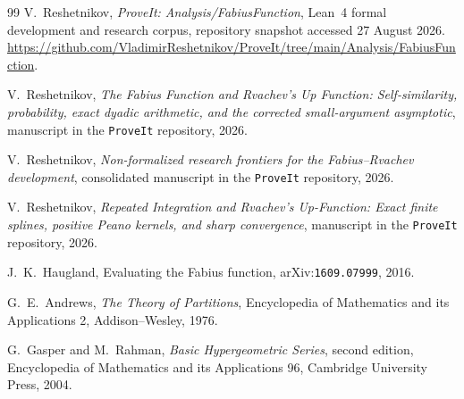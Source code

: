 \documentclass[11pt]{article}
\numberwithin{equation}{section}
\theoremstyle{definition}
\theoremstyle{remark}
\begin{document}
\begin{thebibliography}{99}
V.~Reshetnikov,
\newblock \emph{ProveIt: Analysis/FabiusFunction},
\newblock Lean~4 formal development and research corpus, repository snapshot accessed 27 August 2026.
\newblock \url{https://github.com/VladimirReshetnikov/ProveIt/tree/main/Analysis/FabiusFunction}.

V.~Reshetnikov,
\newblock \emph{The Fabius Function and Rvachev's Up Function: Self-similarity, probability, exact dyadic arithmetic, and the corrected small-argument asymptotic},
\newblock manuscript in the \texttt{ProveIt} repository, 2026.

V.~Reshetnikov,
\newblock \emph{Non-formalized research frontiers for the Fabius--Rvachev development},
\newblock consolidated manuscript in the \texttt{ProveIt} repository, 2026.

V.~Reshetnikov,
\newblock \emph{Repeated Integration and Rvachev's Up-Function: Exact finite splines, positive Peano kernels, and sharp convergence},
\newblock manuscript in the \texttt{ProveIt} repository, 2026.

J.~K.~Haugland,
\newblock Evaluating the Fabius function,
\newblock arXiv:\nolinkurl{1609.07999}, 2016.

G.~E.~Andrews,
\newblock \emph{The Theory of Partitions},
\newblock Encyclopedia of Mathematics and its Applications 2, Addison--Wesley, 1976.

G.~Gasper and M.~Rahman,
\newblock \emph{Basic Hypergeometric Series}, second edition,
\newblock Encyclopedia of Mathematics and its Applications 96, Cambridge University Press, 2004.

\end{thebibliography}
\end{document}

